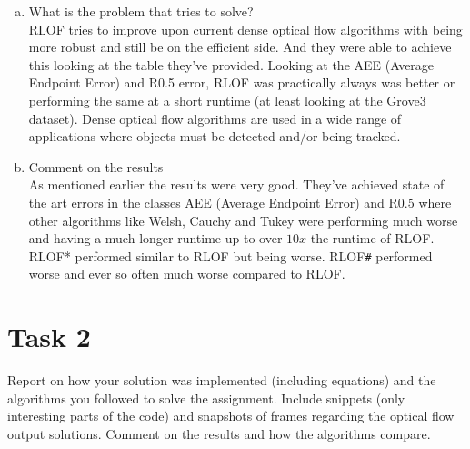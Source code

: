 \documentclass[UTF-8]{article}
\begin{document}
\begin{enumerate}[a.]
		
		
		\item What is the problem that tries to solve?\\
		RLOF tries to improve upon current dense optical flow algorithms with being more robust and still be on the efficient side. And they were able to achieve this looking at the table they've provided. Looking at the AEE (Average Endpoint Error) and R0.5 error, RLOF was practically always was better or performing the same at a short runtime (at least looking at the Grove3 dataset). Dense optical flow algorithms are used in a wide range of applications where objects must be detected and/or being tracked. 
		
		
		
		
		\item Comment on the results\\
		As mentioned earlier the results were very good. They've achieved state of the art errors in the classes AEE (Average Endpoint Error) and R0.5 where other algorithms like Welsh, Cauchy and Tukey were performing much worse and having a much longer runtime up to over $10x$ the runtime of RLOF. RLOF* performed similar to RLOF but being worse. RLOF\verb|#| performed worse and ever so often much worse compared to RLOF.
	\end{enumerate}

\newpage	
	\section*{Task 2}
	Report on how your solution was implemented (including equations) and the algorithms you
	followed to solve the assignment. Include snippets (only interesting parts of the code) and
	snapshots of frames regarding the optical flow output solutions. Comment on the results and how
	the algorithms compare.\\\\
	
\end{document}

